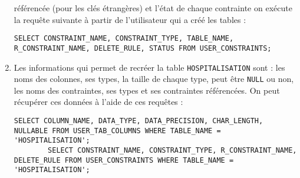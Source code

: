 \documentclass[12pt,a4paper]{article}
\begin{document}
\begin{enumerate}
	référencée (pour les clés étrangères) et l'état de chaque contrainte on exécute la requête suivante à partir de l'utilisateur
	qui a créé les tables :
	\begin{lstlisting}[style=OracleSQL]
		SELECT CONSTRAINT_NAME, CONSTRAINT_TYPE, TABLE_NAME, R_CONSTRAINT_NAME, DELETE_RULE, STATUS FROM USER_CONSTRAINTS;
	\end{lstlisting}
	\item Les informations qui permet de recréer la table \texttt{HOSPITALISATION} sont : les noms des colonnes, ses types, la taille
	de chaque type, peut être \texttt{NULL} ou non, les noms des contraintes, ses types et ses contraintes référencées. On peut
	récupérer ces données à l'aide de ces requêtes :
	\begin{lstlisting}[style=OracleSQL]
		SELECT COLUMN_NAME, DATA_TYPE, DATA_PRECISION, CHAR_LENGTH, NULLABLE FROM USER_TAB_COLUMNS WHERE TABLE_NAME = 'HOSPITALISATION';
		SELECT CONSTRAINT_NAME, CONSTRAINT_TYPE, R_CONSTRAINT_NAME, DELETE_RULE FROM USER_CONSTRAINTS WHERE TABLE_NAME = 'HOSPITALISATION';
	\end{lstlisting}
\end{enumerate}
\end{document}
